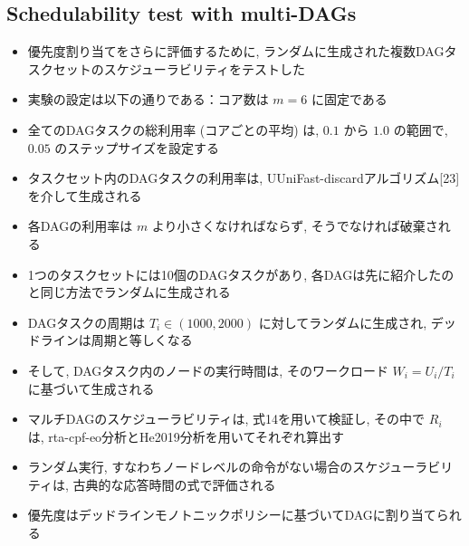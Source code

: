 \subsection{Schedulability test with multi-DAGs}
\label{ssec: Schedulability test with multi-DAGs}

\begin{frame}{}
    \begin{itemize}
        \item 優先度割り当てをさらに評価するために, ランダムに生成された複数DAGタスクセットのスケジューラビリティをテストした
\item 実験の設定は以下の通りである：コア数は $m=6$ に固定である
\item 全てのDAGタスクの総利用率 (コアごとの平均) は, $0.1$ から $1.0$ の範囲で, $0.05$ のステップサイズを設定する
\item タスクセット内のDAGタスクの利用率は, UUniFast-discardアルゴリズム[23]を介して生成される
\item 各DAGの利用率は $m$ より小さくなければならず, そうでなければ破棄される
    \end{itemize}
\end{frame}

\begin{frame}{}
    \begin{itemize}
        \item 1つのタスクセットには10個のDAGタスクがあり, 各DAGは先に紹介したのと同じ方法でランダムに生成される
\item DAGタスクの周期は $T_{i} \in(1000,2000)$ に対してランダムに生成され, デッドラインは周期と等しくなる
\item そして, DAGタスク内のノードの実行時間は, そのワークロード $W_{i}=U_{i} / T_{i}$ に基づいて生成される
\item マルチDAGのスケジューラビリティは, 式14を用いて検証し, その中で $R_{i}$ は, rta-cpf-eo分析とHe2019分析を用いてそれぞれ算出す
\item ランダム実行, すなわちノードレベルの命令がない場合のスケジューラビリティは, 古典的な応答時間の式で評価される
\item 優先度はデッドラインモノトニックポリシーに基づいてDAGに割り当てられる
    \end{itemize}
\end{frame}

